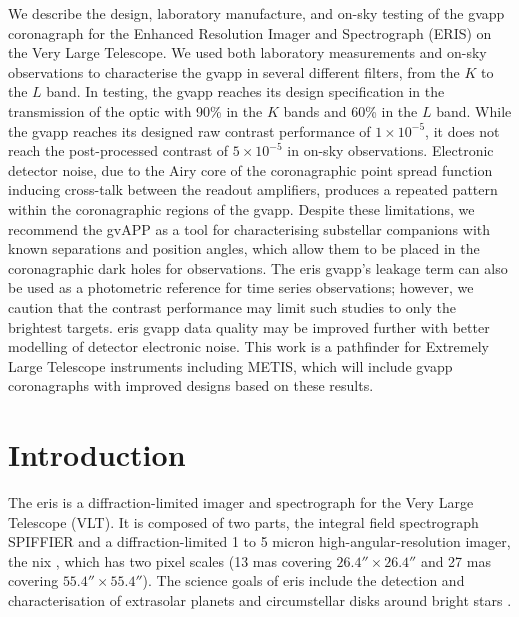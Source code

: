 \documentclass{aa}
\begin{document}
   \date{Received January 26, 2026; accepted March 6, 2026}

  \abstract
   {}
   {We describe the design, laboratory manufacture, and on-sky testing of the \ac{gvapp} coronagraph for the Enhanced Resolution Imager and Spectrograph (ERIS) on the Very Large Telescope.}
   {We used both laboratory measurements and on-sky observations to characterise the \ac{gvapp} in several different filters, from the $K$ to the $L$ band.}
   {In testing, the \ac{gvapp} reaches its design specification in the transmission of the optic with 90\% in the $K$ bands and 60\% in the $L$ band.
   While the \ac{gvapp} reaches its designed raw contrast performance of $1\times10^{-5}$, it does not reach the post-processed contrast of $5\times10^{-5}$ in on-sky observations.
   Electronic detector noise, due to the Airy core of the coronagraphic point spread function inducing cross-talk between the readout amplifiers, produces a repeated pattern within the coronagraphic regions of the \ac{gvapp}.}
   {Despite these limitations, we recommend the gvAPP as a tool for characterising substellar companions with known separations and position angles, which allow them to be placed in the coronagraphic dark holes for observations.
   The \acs{eris} \ac{gvapp}'s leakage term can also be used as a photometric reference for time series observations; however, we caution that the contrast performance may limit such studies to only the brightest targets.
   \acs{eris} \ac{gvapp} data quality may be improved further with better modelling of detector electronic noise.
   This work is a pathfinder for Extremely Large Telescope instruments including METIS, which will include \ac{gvapp} coronagraphs with improved designs based on these results.}


   \maketitle
%

\section{Introduction}

The \acl{eris} \citep[\acs{eris};][]{2023A&A...674A.207D} is a diffraction-limited imager and spectrograph for the Very Large Telescope (VLT).%
%
It is composed of two parts, the integral field spectrograph SPIFFIER \citep{George16} and a diffraction-limited 1 to 5 micron high-angular-resolution imager, the \acl{nix} \citep[\acs{nix};][]{2016SPIE.9908E..3FP}, which has two pixel scales (13 mas covering $26.4''\times26.4''$ and 27 mas covering $55.4''\times55.4''$).
The science goals of \ac{eris} include the detection and characterisation of extrasolar planets and circumstellar disks around bright stars \citep[e.g.][]{2025A&A...698A..52M}.
\end{document}
